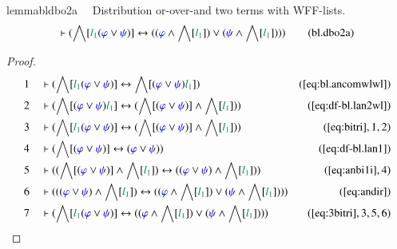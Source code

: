 \begin{restatable}{lemma}{bldbo2a}~~ Distribution or-over-and two terms with
WFF-lists.
\begin{align}
\vdash ( \bigwedge[ \mwl{l_1} ( \mw{\varphi} \vee \mw{\psi} ) ] \leftrightarrow
    ( ( \mw{\varphi} \wedge \bigwedge[ \mwl{l_1} ] ) \vee ( \mw{\psi} \wedge
    \bigwedge[ \mwl{l_1} ] ) ) )\label{eq:bl.dbo2a}\tag{bl.dbo2a}
\end{align}
\end{restatable}

\begin{proof}
\begin{align}
  1 &&  & \vdash ( \bigwedge[ \mwl{l_1} ( \mw{\varphi} \vee \mw{\psi} ) ]
      \leftrightarrow \bigwedge[ ( \mw{\varphi} \vee
      \mw{\psi} ) \mwl{l_1} ]
      )&(\mbox{\ref{eq:bl.ancomwlwl}})\notag
  \\ 2 &&  & \vdash ( \bigwedge[ ( \mw{\varphi} \vee \mw{\psi} ) \mwl{l_1} ]
      \leftrightarrow ( \bigwedge[ ( \mw{\varphi} \vee
      \mw{\psi} ) ] \wedge \bigwedge[ \mwl{l_1} ] )
      )&(\mbox{\ref{eq:df-bl.lan2wl}})\notag
  \\ 3 &&  & \vdash ( \bigwedge[ \mwl{l_1} ( \mw{\varphi} \vee \mw{\psi} ) ]
      \leftrightarrow ( \bigwedge[ ( \mw{\varphi} \vee
      \mw{\psi} ) ] \wedge \bigwedge[ \mwl{l_1} ] )
      )&(\mbox{\ref{eq:bitri}},1,2)\notag
  \\ 4 &&  & \vdash ( \bigwedge[ ( \mw{\varphi} \vee \mw{\psi} ) ]
      \leftrightarrow ( \mw{\varphi} \vee \mw{\psi} )
      )&(\mbox{\ref{eq:df-bl.lan1}})\notag
  \\ 5 &&  & \vdash ( ( \bigwedge[ ( \mw{\varphi} \vee \mw{\psi} ) ] \wedge
      \bigwedge[ \mwl{l_1} ] ) \leftrightarrow ( (
      \mw{\varphi} \vee \mw{\psi} ) \wedge \bigwedge[
      \mwl{l_1} ] ) )&(\mbox{\ref{eq:anbi1i}},4)\notag
  \\ 6 &&  & \vdash ( ( ( \mw{\varphi} \vee \mw{\psi} ) \wedge \bigwedge[
      \mwl{l_1} ] ) \leftrightarrow ( ( \mw{\varphi} \wedge
      \bigwedge[ \mwl{l_1} ] ) \vee ( \mw{\psi} \wedge
      \bigwedge[ \mwl{l_1} ] ) )
      )&(\mbox{\ref{eq:andir}})\notag
  \\ 7 &&  & \vdash ( \bigwedge[ \mwl{l_1} ( \mw{\varphi} \vee \mw{\psi} ) ]
      \leftrightarrow ( ( \mw{\varphi} \wedge \bigwedge[
      \mwl{l_1} ] ) \vee ( \mw{\psi} \wedge \bigwedge[
      \mwl{l_1} ] ) )
      )&(\mbox{\ref{eq:3bitri}},3,5,6)\notag
\end{align}
\end{proof}


